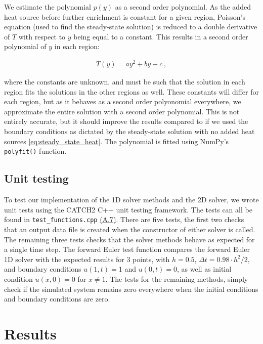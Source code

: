 \documentclass[reprint,english,notitlepage]{revtex4-1}  %
\begin{document}
We estimate the polynomial $p(y)$ as a second order polynomial. As the added heat source before further enrichment is constant for a given region, Poisson's equation (used to find the steady-state solution) is reduced to a double derivative of $T$ with respect to $y$ being equal to a constant. This results in a second order polynomial of $y$ in each region:

\begin{align*}
T(y) = ay^2 + by + c \, ,
\end{align*} 

where the constants are unknown, and must be such that the solution in each region fits the solutions in the other regions as well. These constants will differ for each region, but as it behaves as a second order polyonomial everywhere, we approximate the entire solution with a second order polynomial. This is not entirely accurate, but it should improve the results compared to if we used the boundary conditions as dictated by the steady-state solution with no added heat sources \eqref{eq:steady_state_heat}. The polynomial is fitted using NumPy's \citep{numpy} \verb+polyfit()+ function.


\subsection{Unit testing} \label{sec:method_unit_testing}

To test our implementation of the 1D solver methods and the 2D solver, we wrote unit tests using the CATCH2 C++ unit testing framework. The tests can all be found in \verb+test_functions.cpp+ \hyperref[A.7]{(A.7)}. There are five tests, the first two checks that an output data file is created when the constructor of either solver is called. The remaining three tests checks that the solver methods behave as expected for a single time step. The forward Euler test function compares the forward Euler 1D solver with the expected results for \(3\) points, with \(h=0.5\), \(\Delta t = 0.98\cdot h^{2}/2\), and boundary conditions \(u(1, t) = 1\) and \(u(0, t) = 0\), as well as initial condition \(u(x, 0) = 0\) for \(x \neq 1\). The tests for the remaining methods, simply check if the simulated system remains zero everywhere when the initial conditions and boundary conditions are zero.







 
\clearpage

\section{Results} \label{sec:results}
\end{document}
